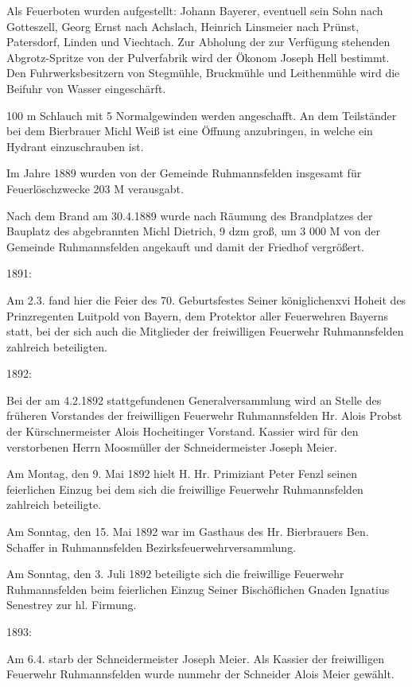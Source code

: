\documentclass{book}
\begin{document}
Als Feuerboten wurden aufgestellt: Johann Bayerer, eventuell sein Sohn nach
Gotteszell, Georg Ernst nach Achslach, Heinrich Linsmeier nach Prünst,
Patersdorf, Linden und Viechtach. Zur Abholung der zur Verfügung stehenden
Abgrotz-Spritze von der Pulverfabrik wird der Ökonom Joseph Hell bestimmt. Den
Fuhrwerksbesitzern von Stegmühle, Bruckmühle und Leithenmühle wird die Beifuhr
von Wasser eingeschärft.

100 m Schlauch mit 5 Normalgewinden werden angeschafft. An dem Teilständer bei
dem Bierbrauer Michl Weiß ist eine Öffnung anzubringen, in welche ein Hydrant
einzuschrauben ist.

Im Jahre 1889 wurden von der Gemeinde Ruhmannsfelden insgesamt für
Feuerlöschzwecke 203 M verausgabt.

Nach dem Brand am 30.4.1889 wurde nach Räumung des Brandplatzes der Bauplatz des
abgebrannten Michl Dietrich, 9 dzm groß, um 3 000 M von der Gemeinde
Ruhmannsfelden angekauft und damit der Friedhof vergrößert.

1891:

Am 2.3. fand hier die Feier des 70. Geburtsfestes Seiner königlichenxvi Hoheit
des Prinzregenten Luitpold von Bayern, dem Protektor aller Feuerwehren Bayerns
statt, bei der sich auch die Mitglieder der freiwilligen Feuerwehr
Ruhmannsfelden zahlreich beteiligten.

1892:

Bei der am 4.2.1892 stattgefundenen Generalversammlung wird an Stelle des
früheren Vorstandes der freiwilligen Feuerwehr Ruhmannsfelden Hr. Alois Probst
der Kürschnermeister Alois Hocheitinger Vorstand. Kassier wird für den
verstorbenen Herrn Moosmüller der Schneidermeister Joseph Meier.

Am Montag, den 9. Mai 1892 hielt H. Hr. Primiziant Peter Fenzl seinen
feierlichen Einzug bei dem sich die freiwillige Feuerwehr Ruhmannsfelden
zahlreich beteiligte.

Am Sonntag, den 15. Mai 1892 war im Gasthaus des Hr. Bierbrauers Ben. Schaffer
in Ruhmannsfelden Bezirksfeuerwehrversammlung.

Am Sonntag, den 3. Juli 1892 beteiligte sich die freiwillige Feuerwehr
Ruhmannsfelden beim feierlichen Einzug Seiner Bischöflichen Gnaden Ignatius
Senestrey zur hl. Firmung.

1893:

Am 6.4. starb der Schneidermeister Joseph Meier. Als Kassier der freiwilligen
Feuerwehr Ruhmannsfelden wurde nunmehr der Schneider Alois Meier gewählt.
\end{document}
